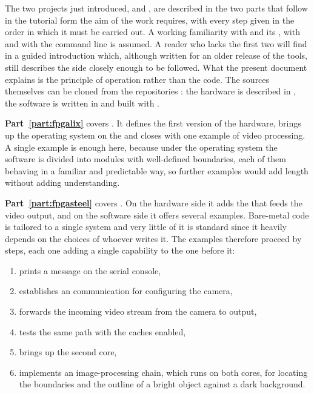 The two projects just introduced,  and , are described in the two parts that follow in the tutorial form the aim of the work requires, with every step given in the order in which it must be carried out. A working familiarity with  and its , with  and with the  command line is assumed. A reader who lacks the first two will find in \cite{UPM-DE1} a guided introduction which, although written for an older release of the tools, still describes the  side closely enough to be followed. What the present document explains is the principle of operation rather than the code. The sources themselves can be cloned from the repositories \cite{FPGALIX-REPO,FPGASTEEL-REPO}: the hardware is described in , the software is written in  and built with .

\textbf{Part~\ref{part:fpgalix}} covers . It defines the first version of the hardware, brings up the operating system on the  and closes with one example of video processing. A single example is enough here, because under the operating system the software is divided into modules with well-defined boundaries, each of them behaving in a familiar and predictable way, so further examples would add length without adding understanding.

\textbf{Part~\ref{part:fpgasteel}} covers . On the hardware side it adds the  that feeds the  video output, and on the software side it offers several examples. Bare-metal code is tailored to a single system and very little of it is standard since it heavily depends on the choices of whoever writes it. The examples therefore proceed by steps, each one adding a single capability to the one before it:

\begin{enumerate}
    \item prints a message on the serial console,
    \item establishes an  communication for configuring the camera,
    \item forwards the incoming video stream from the camera to  output,
    \item tests the same path with the caches enabled,
    \item brings up the second core,
    \item implements an image-processing chain, which runs on both cores, for locating the boundaries and the outline of a bright object against a dark background.
\end{enumerate}

